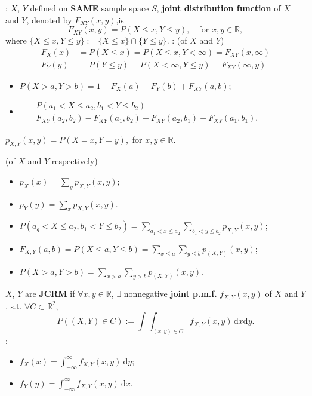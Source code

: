 : \(X\), \(Y\) defined on \textbf{SAME} sample space \(S\),
\textbf{joint distribution function} of 
\(X\) and \(Y\), denoted by \(F_{XY}(x,y)\),is 
\[F_{XY}(x,y) = P(X \leq x, Y \leq y), \quad \text{for }x,y\in \mathbb{R},\]
where \(\{X \leq x, Y \leq y\} := \{X \leq x\}\cap \{Y \leq y\}\).
: (of \(X\) and \(Y\))
\begin{align*}
  F_X(x) &= P(X \leq x) = P(X \leq x, Y < \infty) = F_{XY}(x,\infty) \\
  F_Y(y) &= P(Y \leq y) = P(X < \infty, Y \leq y) = F_{XY}(\infty,y)
\end{align*}
\begin{itemize}
  \item \(P(X > a, Y > b) =1 - F_X(a) - F_Y(b) + F_{XY}(a,b)\);
  \item \(\begin{aligned}
     & P(a_1 < X \leq a_2, b_1 < Y \leq b_2) \\
    =& F_{XY}(a_2,b_2) - F_{XY}(a_1,b_2) 
     - F_{XY}(a_2,b_1) + F_{XY}(a_1,b_1).
  \end{aligned}\)
\end{itemize}

 \(p_{X, Y}(x, y) = P(X = x, Y = y),\) for \(x, y \in 
\mathbb{R}\).

 (of \(X\) and \(Y\) respectively)
\begin{multicols}{2}
\begin{itemize}
  \item \(p_X(x) = \sum_{y}p_{X, Y}(x, y)\);
  \item \(p_Y(y) = \sum_{x}p_{X, Y}(x, y)\).
\end{itemize} 
\end{multicols}
\begin{itemize}
  \item \(P(a_q < X \leq a_2,b_1 < Y \leq b_2) = \sum\limits_{a_1 < x \leq a_2}
    \sum\limits_{b_1 < y \leq b_2}p_{X, Y}(x, y)\);
  \item \(F_{X, Y}(a, b) = P(X \leq a, Y \leq b) = \sum\limits_{x\leq
    a}\sum\limits_{y \leq
    b} p_{(X, Y)}(x, y)\);
  \item \(P(X > a, Y > b) = \sum\limits_{x > a}\sum\limits_{y > b}p_{(X, Y)}(x,y)\).
\end{itemize}

 \(X\), \(Y\) are
\textbf{JCRM} if \(\forall x, y \in \mathbb{R}\), \(\exists\) nonnegative
\textbf{joint p.m.f.} \(f_{X, Y}(x, y)\) of
\(X\) and \(Y\), s.t. \(\forall C \subset \mathbb{R}^2\),
\[P\left((X, Y)\in C\right):=\int\int_{(x,y)\in
C}f_{X,Y}(x,y)\,\mathrm{d}x\mathrm{d}y.\]
: 
\begin{multicols}{2}
\begin{itemize}
  \item \(f_X(x)=\int_{-\infty}^{\infty}f_{X, Y}(x,y)\ \mathrm{d}y\);
  \item \(f_Y(y)=\int_{-\infty}^{\infty}f_{X, Y}(x, y)\ \mathrm{d}x\).
\end{itemize} 
\end{multicols}


